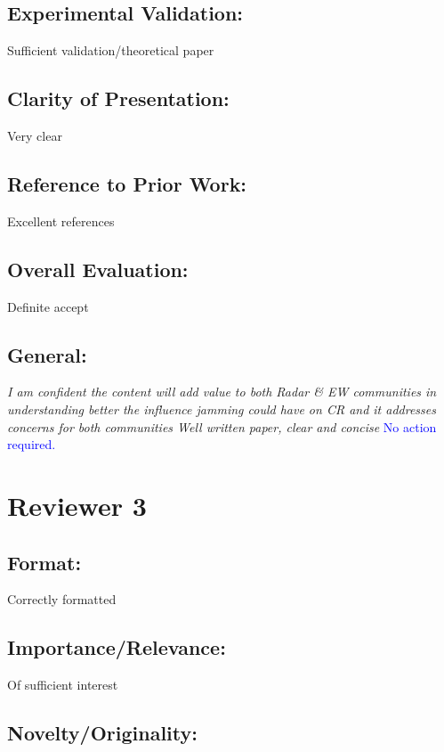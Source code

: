\documentclass[11pt]{amsart}
\begin{document}
\subsection{Experimental Validation:}
 Sufficient validation/theoretical paper

\subsection{Clarity of Presentation:}

 Very clear

\subsection{Reference to Prior Work:}

 Excellent references

\subsection{Overall Evaluation:}

 Definite accept

\subsection{General:}

\emph{I am confident the content will add value to both Radar \& EW communities in understanding better the influence jamming could have on CR and it addresses concerns for both communities Well written paper, clear and concise}
\textcolor{blue}{
No action required.}


\section{Reviewer 3}

\subsection{Format: }
Correctly formatted

\subsection{Importance/Relevance:}

 Of sufficient interest

\subsection{Novelty/Originality:}
\end{document}
